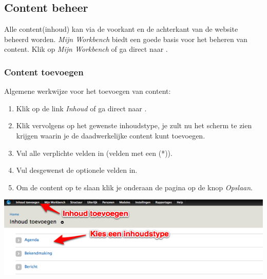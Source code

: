 \subsection{Content beheer}\label{contentbeheer}
Alle content(inhoud) kan via de voorkant en de achterkant van de website beheerd worden. 
\emph{Mijn Workbench} biedt een goede basis voor het beheren van content. Klik op \emph{Mijn Workbench} of ga direct naar . 

\subsubsection{Content toevoegen}\label{contenttoevoegen}
Algemene werkwijze voor het toevoegen van content:
\begin{enumerate}
\item Klik op de link \emph{Inhoud} of ga direct naar .
\item Klik vervolgens op het gewenste inhoudstype, je zult nu het scherm te zien krijgen waarin je de daadwerkelijke content kunt toevoegen.
\item Vul alle verplichte velden in (velden met een (*)).
\item Vul desgewenst de optionele velden in.
\item Om de content op te slaan klik je onderaan de pagina op de knop \emph{Opslaan}.
\end{enumerate}

\bigskip

\begin{center}
	\includegraphics[width=\textwidth]{img/content1.png}
\end{center}

